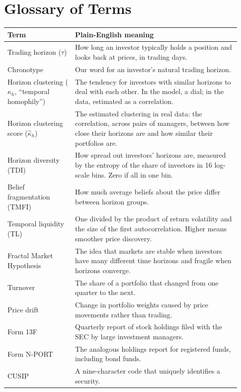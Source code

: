 \appendix

\section{Glossary of Terms}
\label{app:glossary}

\begin{longtable}{p{0.27\linewidth}p{0.66\linewidth}}
\toprule
\textbf{Term} & \textbf{Plain-English meaning}\\
\midrule
\endhead
Trading horizon ($\tau$) & How long an investor typically holds a position and looks back at prices, in trading days.\\
Chronotype & Our word for an investor's natural trading horizon.\\
Horizon clustering ($\kappa_h$, ``temporal homophily'') & The tendency for investors with similar horizons to deal with each other. In the model, a dial; in the data, estimated as a correlation.\\
Horizon clustering score ($\hat\kappa_h$) & The estimated clustering in real data: the correlation, across pairs of managers, between how close their horizons are and how similar their portfolios are.\\
Horizon diversity (TDI) & How spread out investors' horizons are, measured by the entropy of the share of investors in 16 log-scale bins. Zero if all in one bin.\\
Belief fragmentation (TMFI) & How much average beliefs about the price differ between horizon groups.\\
Temporal liquidity (TL) & One divided by the product of return volatility and the size of the first autocorrelation. Higher means smoother price discovery.\\
Fractal Market Hypothesis & The idea that markets are stable when investors have many different time horizons and fragile when horizons converge.\\
Turnover & The share of a portfolio that changed from one quarter to the next.\\
Price drift & Change in portfolio weights caused by price movements rather than trading.\\
Form 13F & Quarterly report of stock holdings filed with the SEC by large investment managers.\\
Form N-PORT & The analogous holdings report for registered funds, including bond funds.\\
CUSIP & A nine-character code that uniquely identifies a security.\\

\end{longtable}
